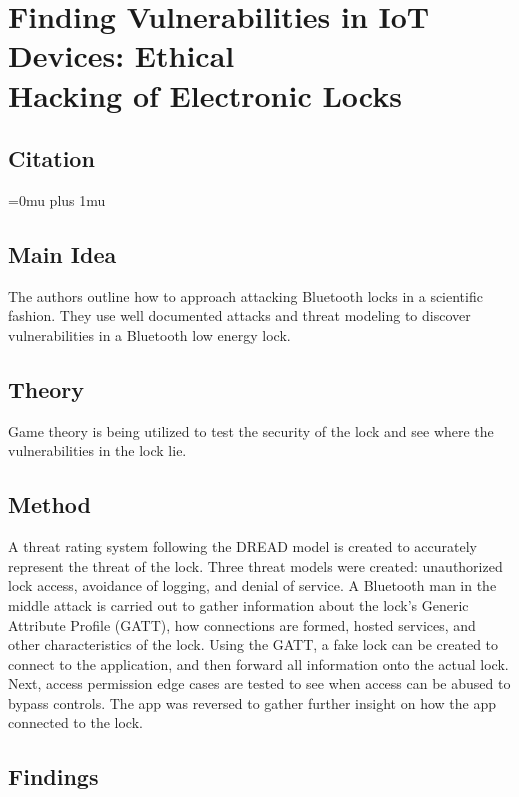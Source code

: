 \documentclass[letterpaper,12pt]{article}
\begin{document}
\section[Finding Vulnerabilities in IoT Devices: Ethical Hacking of Electronic Locks]{Finding Vulnerabilities in IoT Devices: Ethical \\Hacking of Electronic Locks}


\noindent
\subsection{Citation}

\Urlmuskip=0mu plus 1mu\relax
{}

\subsection{Main Idea}

\noindent
The authors outline how to approach attacking Bluetooth locks in a scientific fashion. They use well documented attacks and threat modeling to discover vulnerabilities in a Bluetooth low energy lock.

\subsection{Theory}

\noindent
Game theory is being utilized to test the security of the lock and see where the vulnerabilities in the lock lie. 

\subsection{Method}

\noindent
A threat rating system following the DREAD model is created to accurately represent the threat of the lock. Three threat models were created: unauthorized lock access, avoidance of logging, and denial of service. A Bluetooth man in the middle attack is carried out to gather information about the lock’s Generic Attribute Profile (GATT), how connections are formed, hosted services, and other characteristics of the lock. Using the GATT, a fake lock can be created to connect to the application, and then forward all information onto the actual lock. Next, access permission edge cases are tested to see when access can be abused to bypass controls. The app was reversed to gather further insight on how the app connected to the lock. 

\subsection{Findings}
\end{document}
